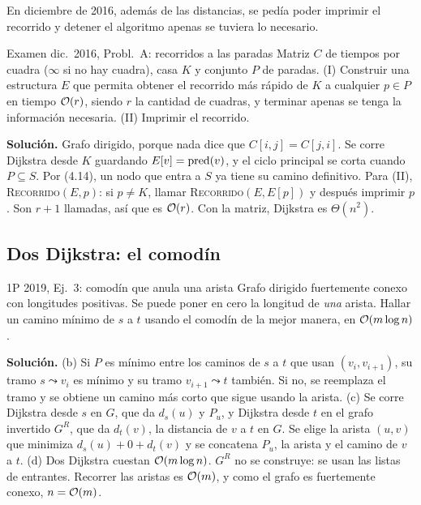 En diciembre de 2016, además de las distancias, se pedía poder imprimir el recorrido y detener el algoritmo apenas se tuviera lo necesario.

\begin{problema}{Examen dic.~2016, Probl.~A: recorridos a las paradas}
Matriz $C$ de tiempos por cuadra ($\infty$ si no hay cuadra), casa $K$ y conjunto $P$ de paradas. (I) Construir una estructura $E$ que permita obtener el recorrido más rápido de $K$ a cualquier $p\in P$ en tiempo $\mathcal{O}(r)$, siendo $r$ la cantidad de cuadras, y terminar apenas se tenga la información necesaria. (II) Imprimir el recorrido.

\smallskip
\textbf{Solución.} Grafo dirigido, porque nada dice que $C[i,j]=C[j,i]$. Se corre Dijkstra desde $K$ guardando $E[v]=\mathrm{pred}(v)$, y el ciclo principal se corta cuando $P\subseteq S$. Por (4.14), un nodo que entra a $S$ ya tiene su camino definitivo. Para (II), \textsc{Recorrido}$(E,p)$: si $p\neq K$, llamar \textsc{Recorrido}$(E,E[p])$ y después imprimir $p$. Son $r+1$ llamadas, así que es $\mathcal{O}(r)$. Con la matriz, Dijkstra es $\Theta(n^2)$.
\end{problema}

\subsection{Dos Dijkstra: el comodín}

\begin{problema}{1P 2019, Ej.~3: comodín que anula una arista}
Grafo dirigido fuertemente conexo con longitudes positivas. Se puede poner en cero la longitud de \emph{una} arista. Hallar un camino mínimo de $s$ a $t$ usando el comodín de la mejor manera, en $\mathcal{O}(m\log n)$.

\smallskip
\textbf{Solución.} (b) Si $P$ es mínimo entre los caminos de $s$ a $t$ que usan $(v_i,v_{i+1})$, su tramo $s\leadsto v_i$ es mínimo y su tramo $v_{i+1}\leadsto t$ también. Si no, se reemplaza el tramo y se obtiene un camino más corto que sigue usando la arista. (c) Se corre Dijkstra desde $s$ en $G$, que da $d_s(u)$ y $P_u$, y Dijkstra desde $t$ en el grafo invertido $G^R$, que da $d_t(v)$, la distancia de $v$ a $t$ en $G$. Se elige la arista $(u,v)$ que minimiza $d_s(u)+0+d_t(v)$ y se concatena $P_u$, la arista y el camino de $v$ a $t$. (d) Dos Dijkstra cuestan $\mathcal{O}(m\log n)$. $G^R$ no se construye: se usan las listas de entrantes. Recorrer las aristas es $\mathcal{O}(m)$, y como el grafo es fuertemente conexo, $n=\mathcal{O}(m)$.
\end{problema}

